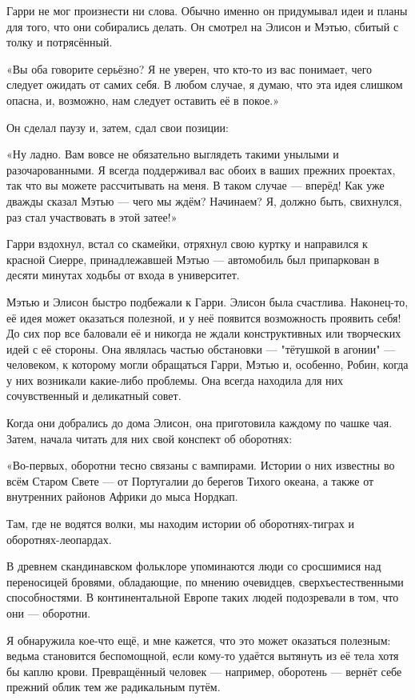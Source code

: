 \documentclass[a4paper,12pt]{book}
\begin{document}
\par
Гарри не мог произнести ни слова. Обычно именно он придумывал идеи и планы для того, что они собирались делать. Он смотрел на Элисон и Мэтью, сбитый с толку и потрясённый.
\par
«Вы оба говорите серьёзно? Я не уверен, что кто-то из вас понимает, чего следует ожидать от самих себя. В любом случае, я думаю, что эта идея слишком опасна, и, возможно, нам следует оставить её в покое.»
\par
Он сделал паузу и, затем, сдал свои позиции:
\par
«Ну ладно. Вам вовсе не обязательно выглядеть такими унылыми и разочарованными. Я всегда поддерживал вас обоих в ваших прежних проектах, так что вы можете рассчитывать на меня. В таком случае — вперёд! Как уже дважды сказал Мэтью — чего мы ждём? Начинаем? Я, должно быть, свихнулся, раз стал участвовать в этой затее!»
\par
Гарри вздохнул, встал со скамейки, отряхнул свою куртку и направился к красной Сиерре, принадлежавшей Мэтью — автомобиль был припаркован в десяти минутах ходьбы от входа в университет.
\par
Мэтью и Элисон быстро подбежали к Гарри. Элисон была счастлива. Наконец-то, её идея может оказаться полезной, и у неё появится возможность проявить себя! До сих пор все баловали её и никогда не ждали конструктивных или творческих идей с её стороны. Она являлась частью обстановки — "тётушкой в агонии" — человеком, к которому могли обращаться Гарри, Мэтью и, особенно, Робин, когда у них возникали какие-либо проблемы. Она всегда находила для них сочувственный и деликатный совет.
\par
Когда они добрались до дома Элисон, она приготовила каждому по чашке чая. Затем, начала читать для них свой конспект об оборотнях:
\par
«Во-первых, оборотни тесно связаны с вампирами. Истории о них известны во всём Старом Свете — от Португалии до берегов Тихого океана, а также от внутренних районов Африки до мыса Нордкап.
\par
Там, где не водятся волки, мы находим истории об оборотнях-тиграх и оборотнях-леопардах.
\par
В древнем скандинавском фольклоре упоминаются люди со сросшимися над переносицей бровями, обладающие, по мнению очевидцев, сверхъестественными способностями. В континентальной Европе таких людей подозревали в том, что они — оборотни.
\par
Я обнаружила кое-что ещё,  и мне кажется, что это может оказаться полезным: ведьма становится беспомощной, если кому-то удаётся вытянуть из её тела хотя бы каплю крови. Превращённый человек — например, оборотень — вернёт себе прежний облик тем же радикальным путём.
\end{document}
